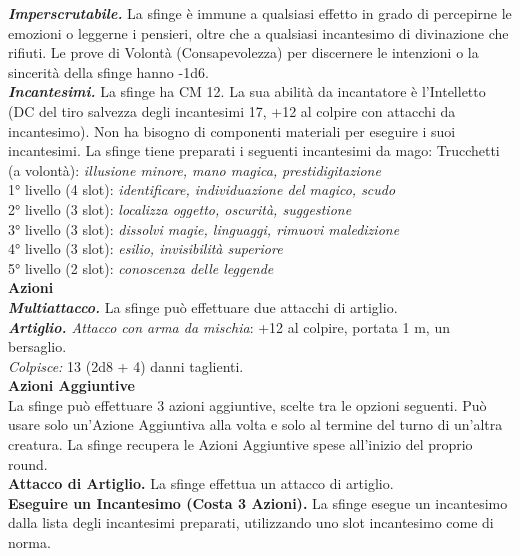 \begin{multicols}{2}
\emph{\textbf{Imperscrutabile.}} La sfinge è immune a qualsiasi effetto in grado di percepirne le emozioni o leggerne i pensieri, oltre che a qualsiasi incantesimo di divinazione che rifiuti. Le prove di Volontà (Consapevolezza) per discernere le intenzioni o la sincerità della sfinge
hanno -1d6.\\

\emph{\textbf{Incantesimi.}} La sfinge ha CM 12. La sua abilità da incantatore è l'Intelletto (DC del tiro salvezza degli incantesimi 17, +12 al colpire con attacchi da incantesimo). Non ha bisogno di componenti materiali per eseguire i suoi incantesimi. La sfinge tiene preparati i seguenti incantesimi da mago: Trucchetti (a volontà): \emph{illusione minore, mano magica,} \emph{prestidigitazione}\\
1° livello (4 slot): \emph{identificare, individuazione del magico, scudo}\\
2° livello (3 slot): \emph{localizza oggetto, oscurità, suggestione}\\
3° livello (3 slot): \emph{dissolvi magie, linguaggi, rimuovi maledizione}\\
4° livello (3 slot): \emph{esilio, invisibilità superiore}\\
5° livello (2 slot): \emph{conoscenza delle leggende}\\
\smallskip\textbf{Azioni}\\
\emph{\textbf{Multiattacco.}} La sfinge può effettuare due attacchi di artiglio.\\
\emph{\textbf{Artiglio.} Attacco con arma da mischia}: +12 al colpire, portata 1 m, un bersaglio.\\
\emph{Colpisce:} 13 (2d8 + 4) danni taglienti.\\
\textbf{Azioni Aggiuntive}\\
La sfinge può effettuare 3 azioni aggiuntive, scelte tra le opzioni seguenti. Può usare solo un'Azione Aggiuntiva alla volta e solo al termine del turno di un'altra creatura. La sfinge recupera le Azioni Aggiuntive spese all'inizio del proprio round. \\
\textbf{Attacco di Artiglio.} La sfinge effettua un attacco di artiglio.\\
\textbf{Eseguire un Incantesimo (Costa 3 Azioni).} La sfinge esegue un incantesimo dalla lista degli incantesimi preparati, utilizzando uno slot incantesimo come di norma.\\


\end{multicols}
